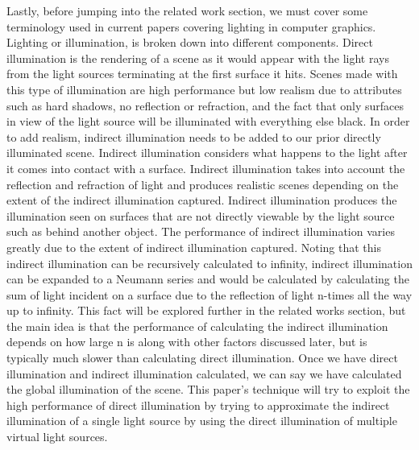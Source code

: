 Lastly, before jumping into the related work section, we must cover some terminology used in current papers covering lighting in computer graphics.  Lighting or illumination, is broken down into different components.  Direct illumination is the rendering of a scene as it would appear with the light rays from the light sources terminating at the first surface it hits.  Scenes made with this type of illumination are high performance but low realism due to attributes such as hard shadows, no reflection or refraction, and the fact that only surfaces in view of the light source will be illuminated with everything else black.  In order to add realism, indirect illumination needs to be added to our prior directly illuminated scene.  Indirect illumination considers what happens to the light after it comes into contact with a surface.  Indirect illumination takes into account the reflection and refraction of light and produces realistic scenes depending on the extent of the indirect illumination captured.  Indirect illumination produces the illumination seen on surfaces that are not directly viewable by the light source such as behind another object.  The performance of indirect illumination varies greatly due to the extent of indirect illumination captured.  Noting that this indirect illumination can be recursively calculated to infinity, indirect illumination can be expanded to a Neumann series and would be calculated by calculating the sum of light incident on a surface due to the reflection of light n-times all the way up to infinity.  This fact will be explored further in the related works section, but the main idea is that the performance of calculating the indirect illumination depends on how large n is along with other factors discussed later, but is typically much slower than calculating direct illumination.  Once we have direct illumination and indirect illumination calculated, we can say we have calculated the global illumination of the scene.  This paper's technique will try to exploit the high performance of direct illumination by trying to approximate the indirect illumination of a single light source by using the direct illumination of multiple virtual light sources.
